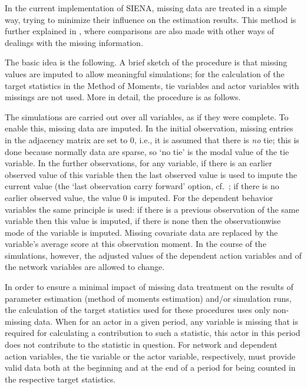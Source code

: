 \documentclass[a4paper,fleqn]{article}
\newcommand{\+}{\, + \,}
\newcommand{\si}{{\sf SIENA}}
\begin{document}
{In the current implementation of \si, missing data are treated in
a simple way, trying to minimize their influence on the estimation
results.
This method is further explained in \citet{HuismanSteglich08},
where comparisons are also made with other ways of dealings with the missing
information.

The basic idea is the following.
A brief sketch of the procedure is that
missing values are imputed to allow meaningful simulations;
for the calculation of the target statistics in the Method of Moments,
tie variables and actor variables with missings are not
used.
More in detail, the procedure is as follows.

The simulations are carried out over all variables,
as if they were complete.
To enable this, missing data are imputed.
In the initial observation, missing entries in the adjacency
matrix are set to 0,
i.e., it is assumed that there is \emph{no} tie;
this is done because normally data are sparse, so `no tie'
is the modal value of the tie variable.
In the further observations, for any variable,
if there is an earlier observed value of this variable then
the last observed value is used to impute the current
value (the `last observation carry forward' option,
cf.\ \citet{Lepkowski89}; if there is no earlier observed
value, the value 0 is imputed.
For the dependent behavior variables the same principle
is used: if there is a previous observation of the same variable
then this value is imputed, if there is none then the
observationwise mode of the variable is imputed.
Missing covariate data are replaced by the
variable's average score at this observation moment. In the course
of the simulations, however, the adjusted values of the dependent
action variables and of the network variables are allowed to
change.

In order to ensure a minimal impact of missing data treatment on
the results of parameter estimation (method of moments estimation)
and/or simulation runs, the calculation of the target statistics
used for these procedures uses only non-missing data. When
for an actor in a given period, any variable is missing that is
required for calculating a contribution to such a statistic, this
actor in this period does not contribute to the statistic in
question. For network and dependent action variables, the tie variable
or the actor variable, respectively,
must provide valid data both at the beginning and at the end of a
period for being counted in the respective target statistics.

\begin{print}
\end{print}
}
\end{document}
